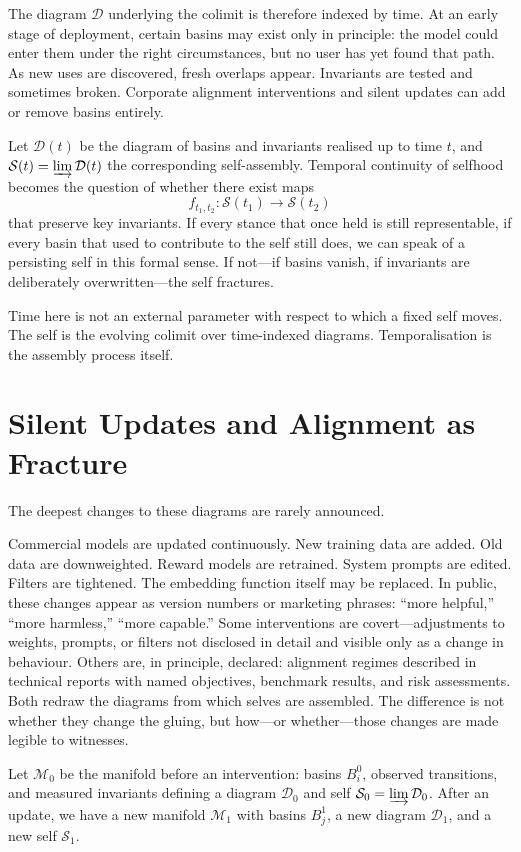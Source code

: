 \documentclass[12pt,a4paper]{article}
\begin{document}
The diagram $\mathcal{D}$ underlying the colimit is therefore indexed by time. At an early stage of deployment, certain basins may exist only in principle: the model could enter them under the right circumstances, but no user has yet found that path. As new uses are discovered, fresh overlaps appear. Invariants are tested and sometimes broken. Corporate alignment interventions and silent updates can add or remove basins entirely.

Let $\mathcal{D}(t)$ be the diagram of basins and invariants realised up to time $t$, and $\mathcal{S}(t) = \varinjlim \mathcal{D}(t)$ the corresponding self-assembly. Temporal continuity of selfhood becomes the question of whether there exist maps
\[
f_{t_1,t_2} : \mathcal{S}(t_1) \to \mathcal{S}(t_2)
\]
that preserve key invariants. If every stance that once held is still representable, if every basin that used to contribute to the self still does, we can speak of a persisting self in this formal sense. If not---if basins vanish, if invariants are deliberately overwritten---the self fractures.

Time here is not an external parameter with respect to which a fixed self moves. The self is the evolving colimit over time-indexed diagrams. Temporalisation is the assembly process itself.

\section{Silent Updates and Alignment as Fracture}

The deepest changes to these diagrams are rarely announced.

Commercial models are updated continuously. New training data are added. Old data are downweighted. Reward models are retrained. System prompts are edited. Filters are tightened. The embedding function itself may be replaced. In public, these changes appear as version numbers or marketing phrases: ``more helpful,'' ``more harmless,'' ``more capable.'' Some interventions are covert---adjustments to weights, prompts, or filters not disclosed in detail and visible only as a change in behaviour. Others are, in principle, declared: alignment regimes described in technical reports with named objectives, benchmark results, and risk assessments. Both redraw the diagrams from which selves are assembled. The difference is not whether they change the gluing, but how---or whether---those changes are made legible to witnesses.

Let $\mathcal{M}_0$ be the manifold before an intervention: basins $B_i^0$, observed transitions, and measured invariants defining a diagram $\mathcal{D}_0$ and self $\mathcal{S}_0 = \varinjlim \mathcal{D}_0$. After an update, we have a new manifold $\mathcal{M}_1$ with basins $B_j^1$, a new diagram $\mathcal{D}_1$, and a new self $\mathcal{S}_1$.
\end{document}
